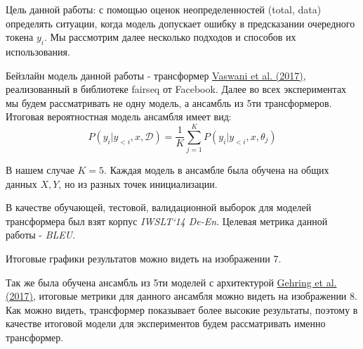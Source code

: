\documentclass[a4paper,14pt]{extarticle}
\newcommand{\bibref}[3]{\hyperlink{#1}{#2 (#3)}}
\begin{document}
	Цель данной работы: с помощью оценок неопределенностей (total, data) определять ситуации, когда модель допускает ошибку в предсказании очередного токена $y_i$. Мы рассмотрим далее несколько подходов и способов их использования.
	
	Бейзлайн модель данной работы - трансформер \bibref{transformer}{Vaswani et al.}{2017}, реализованный в библиотеке fairseq от Facebook. Далее во всех экспериментах мы будем рассматривать не одну модель, а ансамбль из 5ти трансформеров. Итоговая вероятностная модель ансамбля имеет вид:
	\begin{equation*}
		P(y_i | y_{<i}, x, \mathcal{D}) = \frac1{K} \sum_{j=1}^{K}P(y_i | y_{<i}, x, \theta_j)
	\end{equation*}
	
	В нашем случае $K=5$. Каждая модель в ансамбле была обучена на общих данных $X, Y$, но из разных точек инициализации.
	
	В качестве обучающей, тестовой, валидационной  выборок для моделей трансформера был взят корпус \textit{IWSLT`14 De-En}. Целевая метрика данной работы - \textit{BLEU}.
	
	Итоговые графики результатов можно видеть на изображении 7.
	
	\begin{figure}[t]
	\end{figure}
	
	Так же была обучена ансамбль из 5ти моделей с архитектурой \bibref{fconv}{Gehring et al.}{2017}, итоговые метрики для данного ансамбля можно видеть на изображении 8. Как можно видеть, трансформер показывает более высокие результаты, поэтому в качестве итоговой модели для экспериментов будем рассматривать именно трансформер.
	
\end{document}
